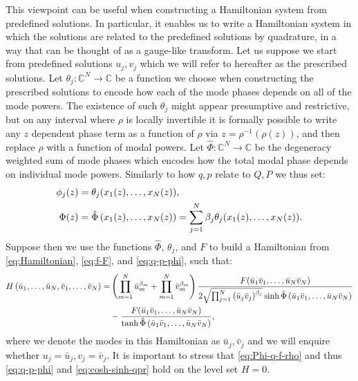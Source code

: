 \documentclass[11pt,a4paper]{article}
\numberwithin{equation}{section}
\begin{document}
This viewpoint can be useful when constructing a Hamiltonian system from predefined solutions.
In particular, it enables us to write a Hamiltonian system in which the solutions are related to the predefined solutions by quadrature, in a way that can be thought of as a gauge-like transform.
Let us suppose we start from predefined solutions $u_j, v_j$ which we will refer to hereafter as the prescribed solutions.
Let $\theta_j: \mathbb{C}^N \to \mathbb{C}$ be a function we choose when constructing the prescribed solutions to encode how each of the mode phases depends on all of the mode powers.
The existence of such $\theta_j$ might appear presumptive and restrictive, but on any interval where $\rho$ is locally invertible it is formally possible to write any $z$ dependent phase term as a function of $\rho$ via $z=\rho^{-1}(\rho(z))$, and then replace $\rho$ with a function of modal powers.
Let $\hat{\Phi}: \mathbb{C}^N \to \mathbb{C}$ be the degeneracy weighted sum of mode phases which encodes how the total modal phase depends on individual mode powers. 
Similarly to how $q,p$ relate to $Q,P$ we thus set:
\begin{align}
    \phi_j(z) &= \theta_j(x_1(z), \dots, x_N(z)), \notag \\
    \Phi(z) &= \hat{\Phi}\left(x_1(z), \dots , x_N(z) \right) = \sum_{j=1}^{N}\beta_j\theta_j(x_1(z), \dots, x_N(z)). 
\end{align}
Suppose then we use the functions $\hat{\Phi}$, $\theta_j$, and $F$ to build a Hamiltonian from \eqref{eq:Hamiltonian}, \eqref{eq:f-F}, and \eqref{eq:q-p-phi}, 
such that: 
\begin{align}
    H\left(\bar{u}_1,\dots, \bar{u}_N, \bar{v}_1,\dots, \bar{v}_N\right) =& \left(\prod_{m=1}^{N} \bar{u}_{m}^{{\beta}_{m}} + \prod_{m=1}^{N} \bar{v}_{m}^{{\beta}_{m}}\right) \frac{F{\left(\bar{u}_1 \bar{v}_1, \dots , \bar{u}_N \bar{v}_N \right)}}{2\sqrt{\prod_{j=1}^{N}\left(\bar{u}_j \bar{v}_j\right)^{\beta_j}}\sinh{\hat{\Phi}\left(\bar{u}_1 \bar{v}_1, \dots , \bar{u}_N \bar{v}_N \right)}} \notag \\
    &- \frac{F{\left(\bar{u}_1 \bar{v}_1, \dots , \bar{u}_N \bar{v}_N \right)}}{\tanh{\hat{\Phi}\left(\bar{u}_1 \bar{v}_1, \dots , \bar{u}_N \bar{v}_N \right)}}, \label{eq:H-phihat-F}
\end{align}
where we denote the modes in this Hamiltonian as $\bar{u}_j, \bar{v}_j$ and we will enquire whether $u_j=\bar{u}_j, v_j=\bar{v}_j$.
It is important to stress that \eqref{eq:Phi-q-f-rho} and thus \eqref{eq:q-p-phi} and \eqref{eq:cosh-sinh-qpr} hold on the level set $H=0$.
\end{document}
